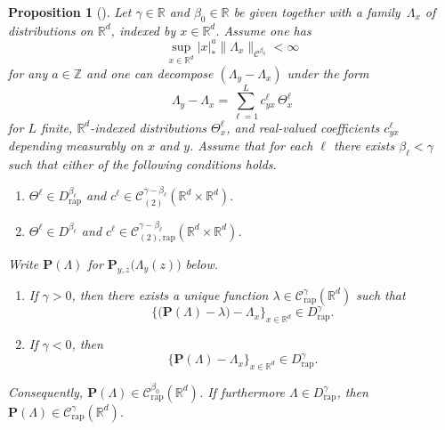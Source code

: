\documentclass[10pt]{amsart}
\newenvironment{enumeratei}
{\bgroup\def\theenumi{\roman{enumi}}\def\theenumii{\arabic{enumii}}\begin{enumerate}}
{\end{enumerate}\egroup}
\newenvironment{enumeratea}
{\bgroup\def\theenumi{\alph{enumi}}\begin{enumerate}}
{\end{enumerate}\egroup}
\theoremstyle{plain}
\newtheorem{prop}[thm]{Proposition}
\theoremstyle{definition}
\newcommand{\rap}{\mathrm{rap}}
\newcommand{\bfP}{\mathbf{P}}
\newcommand{\bbR}{\mathbb{R}}
\newcommand{\bbZ}{\mathbb{Z}}
\newcommand{\mcC}{\mathcal{C}}
\begin{document}
\begin{prop}[{\cite[Prop.\,9]{BH}}] \label{prop:reconstruction}
Let $\gamma\!\in\!\bbR$ and $\beta_0\!\in\!\bbR$ be given together with a fam\-ily~$\Lambda_x$ of distributions on $\bbR^d$, indexed by $x\in\bbR^d$. Assume one has
\[
\sup_{x\in\bbR^d}|x|_*^a\|\Lambda_x\|_{\mcC^{\beta_0}}< \infty
\]
for any $a\in\bbZ$ and one can decompose $(\Lambda_y - \Lambda_x)$ under the form
\begin{equation*}
\Lambda_y - \Lambda_x = \sum_{\ell=1}^L c^\ell_{yx}\,\Theta_x^\ell
\end{equation*}
for $L$ finite, $\bbR^d$-indexed distributions $\Theta_x^\ell$, and real-valued coefficients $c_{yx}^\ell$ depending measurably on $x$ and $y$.
Assume that for each $\ell$ there exists $\beta_\ell<\gamma$ such that either of the following conditions holds.
\begin{enumeratea}
\item\label{prop:reconstructiona} $\Theta^\ell\in D_{\rap}^{\beta_\ell}$ and $c^\ell\in\mcC_{(2)}^{\gamma-\beta_\ell}(\bbR^d\times\bbR^d)$.
\item\label{prop:reconstructionb} $\Theta^\ell\in D^{\beta_\ell}$ and $c^\ell\in\mcC_{(2),\rap}^{\gamma-\beta_\ell}(\bbR^d\times\bbR^d)$.
\end{enumeratea}

\noindent Write ${\bfP}(\Lambda)$ for ${\bfP}_{y,z}\bigl(\Lambda_y(z)\bigr)$ below.

\begin{enumeratei}
\item If $\gamma>0$, then there exists a unique function $\lambda\in \mcC_{\rap}^\gamma(\bbR^d)$ such that
\[
\big\{\bigl(\bfP(\Lambda)-\lambda\bigr) - \Lambda_x\big\}_{x\in\bbR^d}\in D_\rap^\gamma.
\]
\item If $\gamma<0$, then
\[
\big\{\bfP(\Lambda)-\Lambda_x\big\}_{x\in\bbR^d}\in D_\rap^\gamma.
\]
\end{enumeratei}
Consequently, $\bfP(\Lambda)\in \mcC_\rap^{\beta_0}(\bbR^d)$. If furthermore $\Lambda\in D_\rap^\gamma$, then $\bfP(\Lambda)\in \mcC_\rap^\gamma(\bbR^d)$.
\end{prop}
\end{document}
